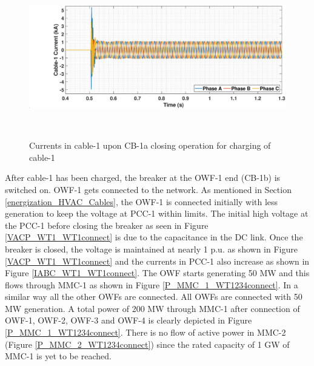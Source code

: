 \begin{figure}[H]
    \includegraphics[height = 7cm,width = \textwidth]{Diagrams/Chapter_5/IABC_Cab1_Cab1charg.eps}
    \caption{Currents in cable-1 upon CB-1a closing operation for charging of cable-1}
    \label{fig:IABC_Cab1_Cab1charg}
\end{figure}

After cable-1 has been charged, the breaker at the \gls{OWF}-1 end (CB-1b) is switched on. \gls{OWF}-1 gets connected to the network. As mentioned in Section \ref{energization_HVAC_Cables}, the \gls{OWF}-1 is connected initially with less generation to keep the voltage at \gls{PCC}-1 within limits. The initial high voltage at the \gls{PCC}-1 before closing the breaker as seen in Figure \ref{VACP_WT1_WT1connect} is due to the capacitance in the DC link. Once the breaker is closed, the voltage is maintained at nearly 1 p.u. as shown in Figure \ref{VACP_WT1_WT1connect} and the currents in \gls{PCC}-1 also increase as shown in Figure \ref{IABC_WT1_WT1connect}. The \gls{OWF} starts generating 50 MW and this flows through \gls{MMC}-1 as shown in Figure \ref{P_MMC_1_WT1234connect}. In a similar way all the other \gls{OWF}s are connected. All \gls{OWF}s are connected with 50 MW generation. A total power of 200 MW through \gls{MMC}-1 after connection of \gls{OWF}-1, \gls{OWF}-2, \gls{OWF}-3 and \gls{OWF}-4 is clearly depicted in Figure \ref{P_MMC_1_WT1234connect}. There is no flow of active power in \gls{MMC}-2 (Figure \ref{P_MMC_2_WT1234connect}) since the rated capacity of 1 GW of \gls{MMC}-1 is yet to be reached. %

